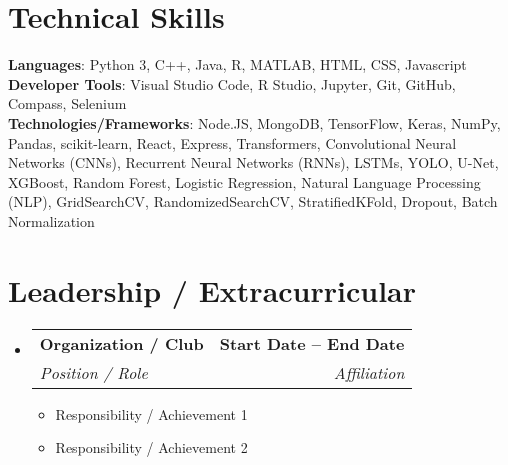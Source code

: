 \documentclass[letterpaper,11pt]{article}
\makeatletter
\newcommand{\resumeItem}[1]{\item\small{#1 \vspace{-2pt}}}
\newcommand{\resumeSubheading}[4]{
  \vspace{-2pt}\item
  \begin{tabular*}{1.0\textwidth}[t]{l@{\extracolsep{\fill}}r}
    \textbf{#1} & \textbf{\small #2} \\
    \textit{\small#3} & \textit{\small #4} \\
  \end{tabular*}\vspace{-7pt}
}
\newcommand{\resumeItemListStart}{\begin{itemize}}
\newcommand{\resumeItemListEnd}{\end{itemize}\vspace{-5pt}}
\newcommand{\resumeSubHeadingListStart}{\begin{itemize}[leftmargin=0.0in, label={}]}
\newcommand{\resumeSubHeadingListEnd}{\end{itemize}}
\makeatother
\begin{document}
\section{Technical Skills}
\begin{itemize}[leftmargin=0.15in, label={}]
    \small{\item{
     \textbf{Languages}{: Python 3, C++, Java, R, MATLAB, HTML, CSS, Javascript} \\
     \textbf{Developer Tools}{: Visual Studio Code, R Studio, Jupyter, Git, GitHub, Compass, Selenium} \\
     \textbf{Technologies/Frameworks}{: Node.JS, MongoDB, TensorFlow, Keras, NumPy, Pandas, scikit-learn, React, Express, Transformers, Convolutional Neural Networks (CNNs), Recurrent Neural Networks (RNNs), LSTMs, YOLO, U-Net, XGBoost, Random Forest, Logistic Regression, Natural Language Processing (NLP), GridSearchCV, RandomizedSearchCV, StratifiedKFold, Dropout, Batch Normalization} \\
    }}
\end{itemize}

\section{Leadership / Extracurricular}
\resumeSubHeadingListStart
  \resumeSubheading
    {Organization / Club}{Start Date -- End Date}
    {Position / Role}{Affiliation}
    \resumeItemListStart
        \resumeItem{Responsibility / Achievement 1}
        \resumeItem{Responsibility / Achievement 2}
    \resumeItemListEnd
\resumeSubHeadingListEnd
\end{document}
